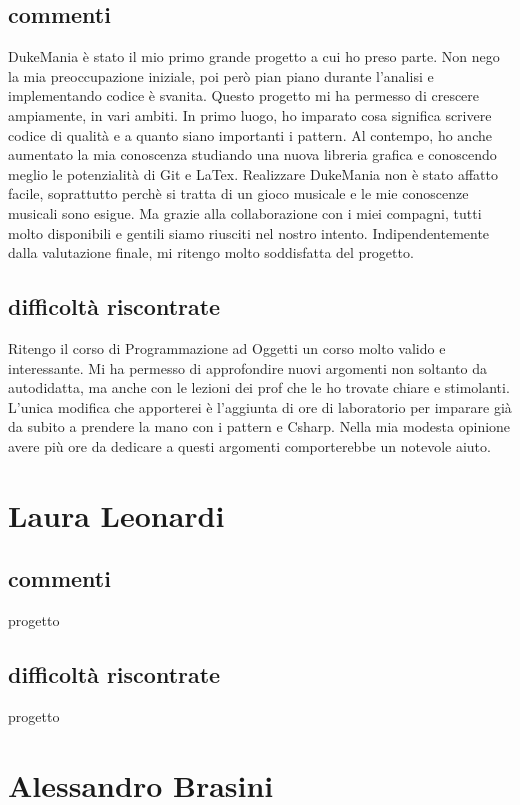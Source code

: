 \documentclass[a4paper,12pt]{report}
\begin{document}
\subsection{commenti}
DukeMania è stato il mio primo grande progetto a cui ho preso parte. 
Non nego la mia preoccupazione iniziale, poi però pian piano durante l'analisi e implementando codice è svanita.
Questo progetto mi ha permesso di crescere ampiamente, in vari ambiti.
In primo luogo, ho imparato cosa significa scrivere codice di qualità e a quanto siano importanti i pattern.
Al contempo, ho anche aumentato la mia conoscenza studiando una nuova libreria grafica e conoscendo meglio le potenzialità di Git e LaTex. 
Realizzare DukeMania non è stato affatto facile, soprattutto perchè si tratta di un gioco musicale e le mie conoscenze musicali
sono esigue. Ma grazie alla collaborazione con i miei compagni, tutti molto disponibili e gentili siamo riusciti nel nostro intento.
Indipendentemente dalla valutazione finale, mi ritengo molto soddisfatta del progetto.
\subsection{difficoltà riscontrate}
Ritengo il corso di Programmazione ad Oggetti un corso molto valido e interessante. 
Mi ha permesso di approfondire nuovi argomenti non soltanto da autodidatta, ma anche con le lezioni dei prof 
che le ho trovate chiare e stimolanti. L'unica modifica che apporterei è l'aggiunta di ore di laboratorio per
imparare già da subito a prendere la mano con i pattern e Csharp. Nella mia modesta opinione avere più ore da dedicare a questi argomenti
comporterebbe un notevole aiuto.
\newpage
\section{Laura Leonardi}
\subsection{commenti}
progetto 
\subsection{difficoltà riscontrate}
progetto 
\newpage

\section{Alessandro Brasini}
\end{document}
